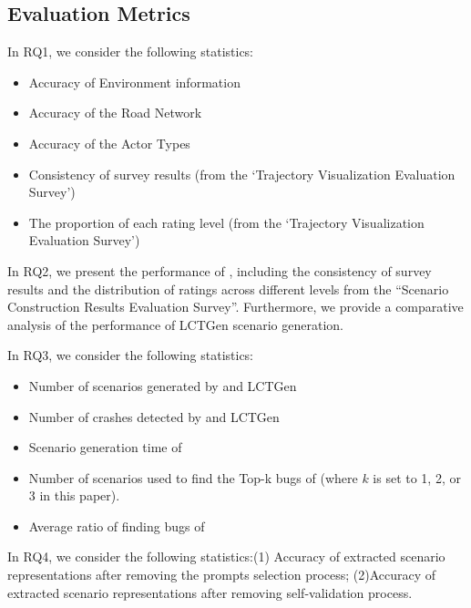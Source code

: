 \subsection{Evaluation Metrics}
In RQ1, we consider the following statistics:
\begin{itemize}
\item Accuracy of Environment information
\item Accuracy of the Road Network
\item Accuracy of the Actor Types
\item Consistency of survey results (from the `Trajectory Visualization Evaluation Survey')
\item The proportion of each rating level (from the `Trajectory Visualization Evaluation Survey')
\end{itemize}

In RQ2, we present the performance of {\tool}, including the consistency of survey results and the distribution of ratings across different levels from the ``Scenario Construction Results Evaluation Survey''. Furthermore, we provide a comparative analysis of the performance of LCTGen scenario generation.

In RQ3, we consider the following statistics:
\begin{itemize}
\item Number of scenarios generated by {\tool} and LCTGen
\item Number of crashes detected by {\tool} and LCTGen
\item Scenario generation time of {\tool}
\item Number of scenarios used to find the Top-k bugs of {\tool} (where $k$ is set to 1, 2, or 3 in this paper).
\item Average ratio of finding bugs of {\tool}
\end{itemize}
 In RQ4, we consider the following statistics:(1) Accuracy of extracted scenario representations after removing the prompts selection process; (2)Accuracy of extracted scenario representations after removing self-validation process.

